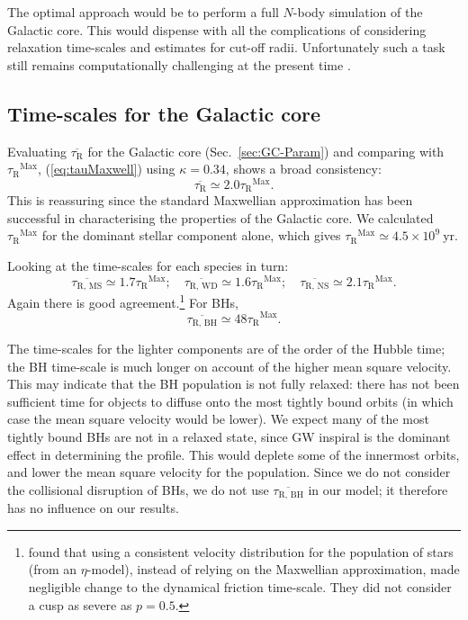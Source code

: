 \documentclass[useAMS,usedcolumn,usegraphicx,usenatbib]{mn2e}
\newcommand{\eqnref}[1]{(\ref{eq:#1})}
\newcommand{\secref}[1]{Sec.~\ref{sec:#1}}
\newcommand{\units}[1]{\ensuremath{~\mathrm{#1}}}
\newcommand{\sub}[1]{\ensuremath{_\mathrm{#1}}}
\newcommand{\super}[1]{\ensuremath{^\mathrm{#1}}}
\begin{document}
\begin{onecolumn}
The optimal approach would be to perform a full $N$-body simulation of the Galactic core. This would dispense with all the complications of considering relaxation time-scales and estimates for cut-off radii. Unfortunately such a task still remains computationally challenging at the present time \citep[e.g.,][]{Li2012}.

\subsection{Time-scales for the Galactic core}\label{sec:tauGC}

Evaluating $\overline{\tau\sub{R}}$ for the Galactic core (\secref{GC-Param}) and comparing with $\tau\sub{R}\super{Max}$, \eqnref{tauMaxwell} using $\kappa = 0.34$, shows a broad consistency:
\begin{equation}
\overline{\tau\sub{R}} \simeq 2.0 \tau\sub{R}\super{Max}.
\end{equation}
This is reassuring since the standard Maxwellian approximation has been successful in characterising the properties of the Galactic core. We calculated $\tau\sub{R}\super{Max}$ for the dominant stellar component alone, which gives $\tau\sub{R}\super{Max}\simeq 4.5 \times 10^9\units{yr}$.

Looking at the time-scales for each species in turn:
\begin{equation}
\overline{\tau\sub{R,\,MS}} \simeq 1.7 \tau\sub{R}\super{Max};\quad \overline{\tau\sub{R,\,WD}} \simeq 1.6 \tau\sub{R}\super{Max};\quad \overline{\tau\sub{R,\,NS}} \simeq 2.1 \tau\sub{R}\super{Max}.
\end{equation}
Again there is good agreement.\footnote{\citet*{Freitag2006} found that using a consistent velocity distribution for the population of stars (from an $\eta$-model), instead of relying on the Maxwellian approximation, made negligible change to the dynamical friction time-scale. They did not consider a cusp as severe as $p = 0.5$.} For BHs,
\begin{equation}
\overline{\tau\sub{R,\,BH}} \simeq 48 \tau\sub{R}\super{Max}.
\end{equation}

The time-scales for the lighter components are of the order of the Hubble time; the BH time-scale is much longer on account of the higher mean square velocity. This may indicate that the BH population is not fully relaxed: there has not been sufficient time for objects to diffuse onto the most tightly bound orbits (in which case the mean square velocity would be lower). We expect many of the most tightly bound BHs are not in a relaxed state, since GW inspiral is the dominant effect in determining the profile. This would deplete some of the innermost orbits, and lower the mean square velocity for the population. Since we do not consider the collisional disruption of BHs, we do not use $\overline{\tau\sub{R,\,BH}}$ in our model; it therefore has no influence on our results.


\end{onecolumn}
\end{document}
